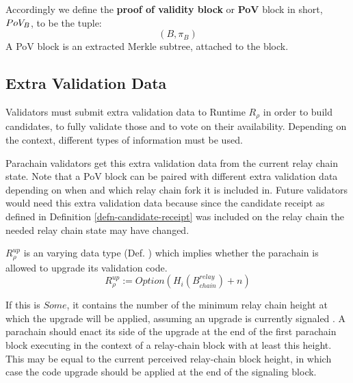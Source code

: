 \begin{definition}
  \label{defn-pov-block}
  Accordingly we define the {\bf proof of validity block} or {\bf PoV} block in
  short, {\bf $PoV_B$}, to be the tuple:
  \[
  (B, \pi_B)
  \]
  A PoV block is an extracted Merkle subtree, attached to the block.
\end{definition}

\subsection{Extra Validation Data}

Validators must submit extra validation data to Runtime $R_{\rho}$ in order to
build candidates, to fully validate those and to vote on their availability.
Depending on the context, different types of information must be used.
\newline

Parachain validators get this extra validation data from the current relay
chain state. Note that a PoV block can be paired with different extra
validation data depending on when and which relay chain fork it is included
in. Future validators would need this extra validation data because since the
candidate receipt as defined in Definition \ref{defn-candidate-receipt} was
included on the relay chain the needed relay chain state may have changed.

\begin{definition}
  \label{defn-upgrade-indicator}
  $R^{up}_{\rho}$ is an varying data type (Def. ) which implies
  whether the parachain is allowed to upgrade its validation code.
  \[
    R^{up}_{\rho} := Option(H_i(B^{relay}_{chain})+n)
  \]


  If this is $Some$, it contains the number of the minimum relay chain height
  at which the upgrade will be applied, assuming an upgrade is currently
  signaled . A parachain should enact its
  side of the upgrade at the end of the first parachain block executing in the
  context of a relay-chain block with at least this height. This may be equal to
  the current perceived relay-chain block height, in which case the code upgrade
  should be applied at the end of the signaling block.
\end{definition}

